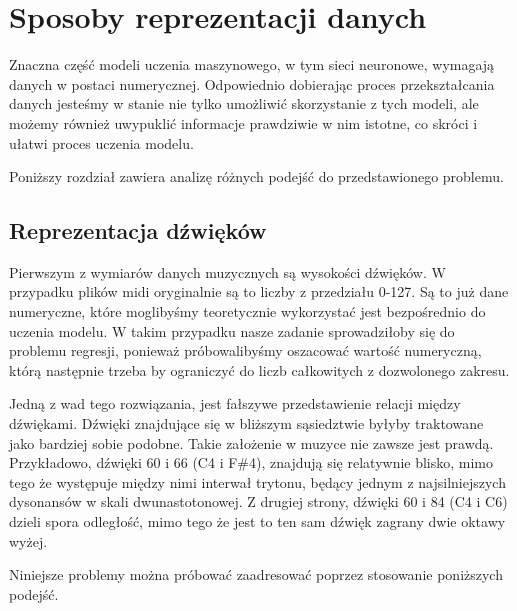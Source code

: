 \chapter{Sposoby reprezentacji danych}
{
    Znaczna część modeli uczenia maszynowego, w tym sieci neuronowe, wymagają 
    danych w postaci numerycznej. Odpowiednio dobierając proces przekształcania danych
    jesteśmy w stanie nie tylko umożliwić skorzystanie z tych modeli, ale możemy również
    uwypuklić informacje prawdziwie w nim istotne, co skróci i ułatwi proces uczenia modelu.

    Poniższy rozdział zawiera analizę różnych podejść do przedstawionego problemu.

    \section{Reprezentacja dźwięków}
    {
        Pierwszym z wymiarów danych muzycznych są wysokości dźwięków. W przypadku plików midi
        oryginalnie są to liczby z przedziału 0-127. Są to już dane numeryczne, które
        moglibyśmy teoretycznie wykorzystać jest bezpośrednio do uczenia modelu.
        W takim przypadku nasze zadanie sprowadziłoby się do problemu regresji, ponieważ próbowalibyśmy
        oszacować wartość numeryczną, którą następnie trzeba by ograniczyć do liczb całkowitych z dozwolonego zakresu.

        Jedną z wad tego rozwiązania, jest fałszywe przedstawienie relacji między dźwiękami.
        Dźwięki znajdujące się w bliższym sąsiedztwie byłyby traktowane jako bardziej sobie podobne.
        Takie założenie w muzyce nie zawsze jest prawdą. Przykładowo, dźwięki 60 i 66 (C4 i F\#4), znajdują się
        relatywnie blisko, mimo tego że występuje między nimi interwał trytonu, będący jednym z najsilniejszych dysonansów w skali 
        dwunastotonowej. Z drugiej strony, dźwięki 60 i 84 (C4 i C6) dzieli spora odległość, mimo tego że jest to ten sam dźwięk
        zagrany dwie oktawy wyżej.

        Niniejsze problemy można próbować zaadresować poprzez stosowanie poniższych podejść.

}}
